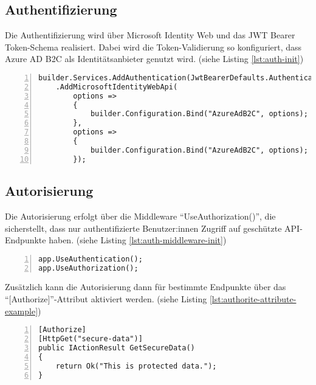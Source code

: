 \subsection{Authentifizierung}

Die Authentifizierung wird über Microsoft Identity Web und das JWT Bearer Token-Schema realisiert. 
Dabei wird die Token-Validierung so konfiguriert, dass Azure AD B2C als Identitätsanbieter 
genutzt wird. (siehe Listing \ref{lst:auth-init})

\begin{lstlisting}[numbers=left,caption={Authentifizierung-Initialisierung},label={lst:auth-init}]
builder.Services.AddAuthentication(JwtBearerDefaults.AuthenticationScheme)
    .AddMicrosoftIdentityWebApi(
        options => 
        {
            builder.Configuration.Bind("AzureAdB2C", options);
        },
        options =>
        {
            builder.Configuration.Bind("AzureAdB2C", options);
        });

\end{lstlisting}

\subsection{Autorisierung}

Die Autorisierung erfolgt über die Middleware ``UseAuthorization()'', die sicherstellt, 
dass nur authentifizierte Benutzer:innen Zugriff auf geschützte API-Endpunkte haben. 
(siehe Listing \ref{lst:auth-middleware-init})

\begin{lstlisting}[numbers=left,caption={Autorisierungs Middleware Initialisierung},label={lst:auth-middleware-init}]
app.UseAuthentication();
app.UseAuthorization();    
\end{lstlisting}

Zusätzlich kann die Autorisierung dann für bestimmte Endpunkte über 
das ``[Authorize]''-Attribut aktiviert werden. 
(siehe Listing \ref{lst:authorite-attribute-example})

\begin{lstlisting}[numbers=left,caption={Authorize-Attribut Beispiel},label={lst:authorite-attribute-example}]
[Authorize]
[HttpGet("secure-data")]
public IActionResult GetSecureData()
{
    return Ok("This is protected data.");
}    
\end{lstlisting}


